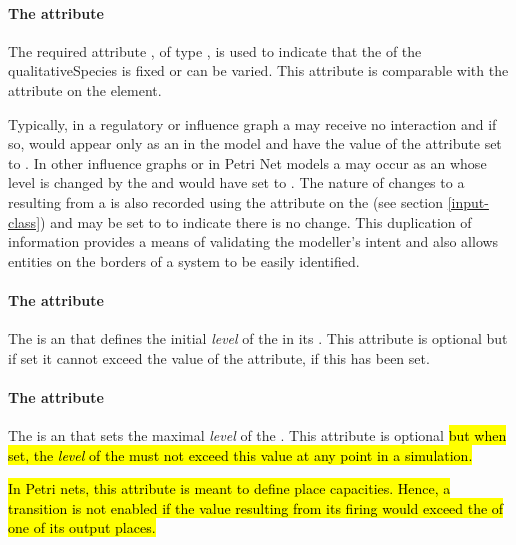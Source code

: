 \paragraph{The  attribute}
The required attribute , of type , is used to indicate that the  of the qualitativeSpecies is fixed or can be varied. This attribute is comparable with the  attribute on the  element.

Typically, in a regulatory or influence graph a \QualitativeSpecies may receive no interaction and if so, would appear only as an \Input in the model and have the value of the  attribute set to . In other influence graphs or in Petri Net models a \QualitativeSpecies may occur as an \Input whose level is changed by the \Transition and would have  set to .  The nature of changes to a \QualitativeSpecies resulting from a \Transition is also recorded using the  attribute on the \Input (see section \ref{input-class}) and may be set to  to indicate there is no change. This duplication of information provides a means of validating the modeller's intent and also allows entities on the borders of a system to be easily identified.
 


\paragraph{The   attribute}
The  is an  that defines the initial \emph{level} of the \QualitativeSpecies in its . This attribute is optional but if set it cannot exceed the value of the  attribute, if this has been set.

\paragraph{The  attribute}
The  is an  that sets the maximal \emph{level} of the . This attribute is optional \hl{but when set, the \emph{level} of the \QualitativeSpecies must not exceed this value at any point in a simulation.}

\hl{In Petri nets, this attribute is meant to define place capacities. Hence, a transition is not enabled if the value resulting from its firing would exceed the   of one of its output places. }

